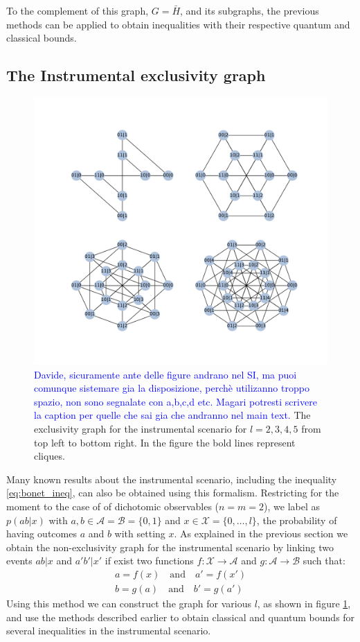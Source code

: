 \documentclass[
    nofootinbin,
    floatfix,
    amsfonts,
    twocolumn, 
    aps, 
    prl]{revtex4-1}
\begin{document}
To the complement of this graph, $G=\bar{H}$, and its subgraphs, the previous
methods can be applied to obtain inequalities with their respective quantum and
classical bounds.

\subsection{The Instrumental exclusivity graph}
\begin{figure}[t]
    \centering
    \includegraphics[width=.7\textwidth]{images/instrumental_exgraph.pdf}
    \caption{\textcolor{blue}{Davide, sicuramente ante delle figure andrano nel SI, ma puoi comunque sistemare gia la disposizione, perchè utilizanno troppo spazio, non sono segnalate con a,b,c,d etc. Magari potresti scrivere la caption per quelle che sai gia che andranno nel main text.} The exclusivity graph for the instrumental scenario for $l=2,3,4,5$
    from top left to bottom right. In the figure the bold lines represent
    cliques.}
    \label{fig:instrumental_exgraphs}
\end{figure}

Many known results about the instrumental scenario, including the inequality
\eqref{eq:bonet_ineq}, can also be obtained using this formalism.  Restricting
for the moment to the case of of dichotomic observables ($n = m = 2$), we label
as $p(ab|x)$ with $a, b \in \mathcal{A} = \mathcal{B} = \{0,1\}$ and $x \in
\mathcal{X} = \{0,\ldots,l\}$, the probability of having outcomes $a$ and $b$
with setting $x$. 
As explained in the previous section we obtain the non-exclusivity graph for the
instrumental scenario by linking two events $ab|x$ and $a'b'|x'$ if exist two
functions $f:\mathcal{X} \rightarrow \mathcal{A}$ and $g:\mathcal{A} \rightarrow
\mathcal{B}$ such that:
\begin{align}
    a = f(x) \quad\text{and}\quad a'=f(x')\\
    b = g(a) \quad\text{and}\quad b'=g(a')
    \label{eq:non_exclusivity_condition}
\end{align}
Using this method we can construct the graph for various $l$, as shown in figure
\ref{fig:instrumental_exgraphs}, and use the methods described earlier to obtain
classical and quantum bounds for several inequalities in the instrumental
scenario. 
\end{document}
